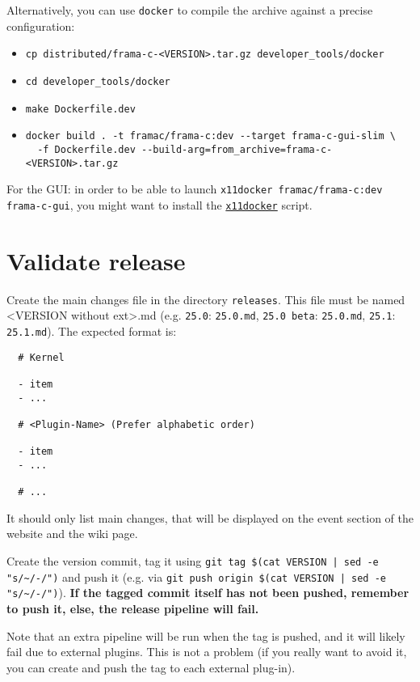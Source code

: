Alternatively, you can use \texttt{docker} to compile the archive against a
precise configuration:
\begin{itemize}
  \item \verb+cp distributed/frama-c-<VERSION>.tar.gz developer_tools/docker+
  \item \verb+cd developer_tools/docker+
  \item \verb+make Dockerfile.dev+
  \item \verb+docker build . -t framac/frama-c:dev --target frama-c-gui-slim \+\\
        \verb+  -f Dockerfile.dev --build-arg=from_archive=frama-c-<VERSION>.tar.gz+
\end{itemize}
For the GUI: in order to be able to launch
\verb+x11docker framac/frama-c:dev frama-c-gui+,
you might want to install the
\href{https://github.com/mviereck/x11docker}{\texttt{x11docker}} script.

\section{Validate release}

Create the main changes file in the directory \texttt{releases}. This file must
be named <VERSION without ext>.md (e.g. \texttt{25.0}: \texttt{25.0.md},
\texttt{25.0~beta}: \texttt{25.0.md}, \texttt{25.1}: \texttt{25.1.md}). The
expected format is:

\begin{lstlisting}
  # Kernel

  - item
  - ...

  # <Plugin-Name> (Prefer alphabetic order)

  - item
  - ...

  # ...
\end{lstlisting}

It should only list main changes, that will be displayed on the event section
of the website and the wiki page.

Create the version commit, tag it using \texttt{git tag \$(cat VERSION | sed -e "s/\textasciitilde /-/")}
and push it (e.g. via \texttt{git push origin \$(cat VERSION | sed -e "s/\textasciitilde/-/")}).
\textbf{
  If the tagged commit itself has not been pushed, remember to push it, else,
  the release pipeline will fail.
}

Note that an extra pipeline will be run when the tag is pushed, and it will
likely fail due to external plugins. This is not a problem (if you really want
to avoid it, you can create and push the tag to each external plug-in).

